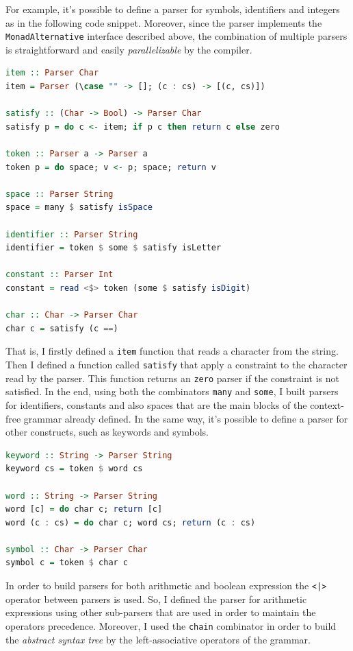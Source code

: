 \documentclass[12pt,a4paper]{article}
\begin{document}
For example, it's possible to define a parser for symbols, identifiers and integers as in the following code snippet.
Moreover, since the parser implements the \texttt{MonadAlternative} interface described above, the combination of multiple parsers is straightforward and easily \textit{parallelizable} by the compiler.
\begin{lstlisting}[language=Haskell, style=custom-style]
item :: Parser Char
item = Parser (\case "" -> []; (c : cs) -> [(c, cs)])

satisfy :: (Char -> Bool) -> Parser Char
satisfy p = do c <- item; if p c then return c else zero

token :: Parser a -> Parser a
token p = do space; v <- p; space; return v

space :: Parser String
space = many $ satisfy isSpace

identifier :: Parser String
identifier = token $ some $ satisfy isLetter

constant :: Parser Int
constant = read <$> token (some $ satisfy isDigit)

char :: Char -> Parser Char
char c = satisfy (c ==)
\end{lstlisting}
That is, I firstly defined a \texttt{item} function that reads a character from the string.
Then I defined a function called \texttt{satisfy} that apply a constraint to the character read by the parser.
This function returns an \texttt{zero} parser if the constraint is not satisfied.
In the end, using both the combinators \texttt{many} and \texttt{some}, I built parsers for identifiers, constants and also spaces that are the main blocks of the context-free grammar already defined.
In the same way, it's possible to define a parser for other constructs, such as keywords and symbols.
\begin{lstlisting}[language=Haskell, style=custom-style]
keyword :: String -> Parser String
keyword cs = token $ word cs

word :: String -> Parser String
word [c] = do char c; return [c]
word (c : cs) = do char c; word cs; return (c : cs)

symbol :: Char -> Parser Char
symbol c = token $ char c
\end{lstlisting}
In order to build parsers for both arithmetic and boolean expression the \texttt{<|>} operator between parsers is used.
So, I defined the parser for arithmetic expressions using other sub-parsers that are used in order to maintain the operators precedence.
Moreover, I used the \texttt{chain} combinator in order to build the \textit{abstract syntax tree} by the left-associative operators of the grammar.
\end{document}
